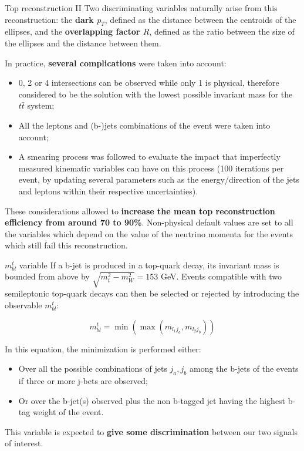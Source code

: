 \documentclass[8pt]{beamer}
\begin{document}
\begin{frame}{Top reconstruction II}
\justifying
Two discriminating variables naturally arise from this reconstruction: the \textbf{dark $p_T$}, defined as the distance between the centroids of the ellipses, and the \textbf{overlapping factor $R$}, defined as the ratio between the size of the ellipses and the distance between them. \vfill

In practice, \textbf{several complications} were taken into account:
\begin{itemize}
\justifying
\item 0, 2 or 4 intersections can be observed while only 1 is physical, therefore considered to be the solution with the lowest possible invariant mass for the $t \bar t$ system;
\item All the leptons and (b-)jets combinations of the event were taken into account;
\item A \alert{smearing process} was followed to evaluate the impact that imperfectly measured kinematic variables can have on this process (100 iterations per event, by updating several parameters such as the energy/direction of the jets and leptons within their respective uncertainties).
\end{itemize} \vfill

These considerations allowed to \textbf{increase the mean top reconstruction efficiency from around 70 to 90\%}. Non-physical default values are set to all the variables which depend on the value of the neutrino momenta for the events which still fail this reconstruction. \vfill
\end{frame}

\begin{frame}{$m_{bl}^t$ variable}
\justifying
If a b-jet is produced in a top-quark decay, its invariant mass is bounded from above by $\sqrt{m_t^2 - m_{W}^2} = 153$ GeV. Events compatible with two semileptonic top-quark decays can then be selected or rejected by introducing the observable $m_{bl}^t$: \vfill

\begin{equation*}
m_{bl}^t = \min \left (\max(m_{l_1 j_a}, m_{l_2 j_b}) \right)
\end{equation*} \vfill

In this equation, the minimization is performed either:
\begin{itemize}
\justifying
\item Over all the possible combinations of jets {$j_a, j_b$} among the b-jets of the events if three or more j-bets are observed;
\item Or over the b-jet(s) observed plus the non b-tagged jet having the highest b-tag weight of the event.
\end{itemize} \vfill 

This variable is expected to \textbf{give some discrimination} between our two signals of interest. \vfill
\end{frame}
\end{document}

